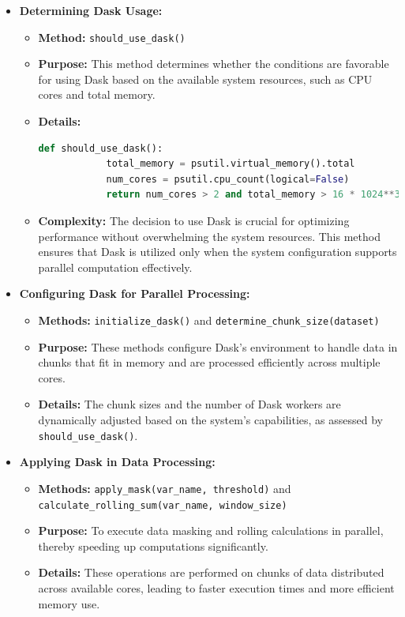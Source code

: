 \documentclass[a4paper,12pt]{article}
\begin{document}
\begin{itemize}
    \item \textbf{Determining Dask Usage:}
    \begin{itemize}
        \item \textbf{Method:} \texttt{should\_use\_dask()}
        \item \textbf{Purpose:} This method determines whether the conditions are favorable for using Dask based on the available system resources, such as CPU cores and total memory.
        \item \textbf{Details:}
        \begin{lstlisting}[language=Python]
        def should_use_dask():
            total_memory = psutil.virtual_memory().total
            num_cores = psutil.cpu_count(logical=False)
            return num_cores > 2 and total_memory > 16 * 1024**3
        \end{lstlisting}
        \item \textbf{Complexity:} The decision to use Dask is crucial for optimizing performance without overwhelming the system resources. This method ensures that Dask is utilized only when the system configuration supports parallel computation effectively.
    \end{itemize}

    \item \textbf{Configuring Dask for Parallel Processing:}
    \begin{itemize}
        \item \textbf{Methods:} \texttt{initialize\_dask()} and \texttt{determine\_chunk\_size(dataset)}
        \item \textbf{Purpose:} These methods configure Dask's environment to handle data in chunks that fit in memory and are processed efficiently across multiple cores.
        \item \textbf{Details:} The chunk sizes and the number of Dask workers are dynamically adjusted based on the system's capabilities, as assessed by \texttt{should\_use\_dask()}.
    \end{itemize}

    \item \textbf{Applying Dask in Data Processing:}
    \begin{itemize}
        \item \textbf{Methods:} \texttt{apply\_mask(var\_name, threshold)} and \texttt{calculate\_rolling\_sum(var\_name, window\_size)}
        \item \textbf{Purpose:} To execute data masking and rolling calculations in parallel, thereby speeding up computations significantly.
        \item \textbf{Details:} These operations are performed on chunks of data distributed across available cores, leading to faster execution times and more efficient memory use.
    \end{itemize}
\end{itemize}
\end{document}
